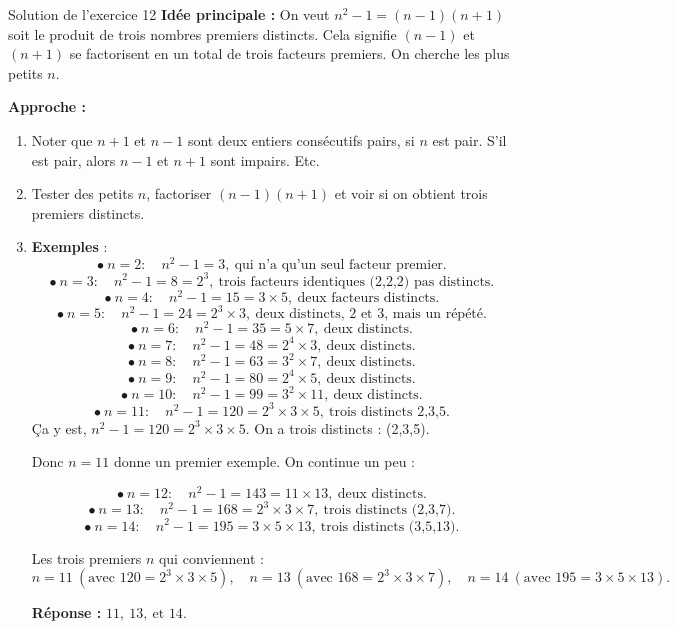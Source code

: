 \documentclass[a4paper,12pt]{article}
\begin{document}
\begin{solutionbox}{Solution de l'exercice 12}
\textbf{Idée principale :} On veut $n^2 -1=(n-1)(n+1)$ soit le produit de trois nombres premiers distincts.  
Cela signifie $(n-1)$ et $(n+1)$ se factorisent en un total de trois facteurs premiers.  
On cherche les plus petits $n$.

\textbf{Approche :}  
\begin{enumerate}
  \item Noter que $n+1$ et $n-1$ sont deux entiers consécutifs pairs, si $n$ est pair. S’il est pair, alors $n-1$ et $n+1$ sont impairs. Etc.  
  \item Tester des petits $n$, factoriser $(n-1)(n+1)$ et voir si on obtient trois premiers distincts.

\item \textbf{Exemples} :
\[
\bullet\ n=2:\quad n^2-1=3,\ \text{qui n’a qu’un seul facteur premier.}
\]
\[
\bullet\ n=3:\quad n^2-1=8=2^3,\ \text{trois facteurs identiques (2,2,2) pas distincts.}
\]
\[
\bullet\ n=4:\quad n^2-1=15=3\times5,\ \text{deux facteurs distincts.}
\]
\[
\bullet\ n=5:\quad n^2-1=24=2^3\times3,\ \text{deux distincts, 2 et 3, mais un répété.}
\]
\[
\bullet\ n=6:\quad n^2-1=35=5\times7,\ \text{deux distincts.}
\]
\[
\bullet\ n=7:\quad n^2-1=48=2^4\times3,\ \text{deux distincts.}
\]
\[
\bullet\ n=8:\quad n^2-1=63=3^2\times7,\ \text{deux distincts.}
\]
\[
\bullet\ n=9:\quad n^2-1=80=2^4\times5,\ \text{deux distincts.}
\]
\[
\bullet\ n=10:\quad n^2-1=99=3^2\times11,\ \text{deux distincts.}
\]
\[
\bullet\ n=11:\quad n^2-1=120=2^3\times3\times5,\ \text{trois distincts 2,3,5.}
\]
Ça y est, $n^2-1=120=2^3\times3\times5$. On a trois distincts : (2,3,5).

Donc $n=11$ donne un premier exemple. On continue un peu :

\[
\bullet\ n=12:\quad n^2-1=143=11\times13,\ \text{deux distincts.}
\]
\[
\bullet\ n=13:\quad n^2-1=168=2^3\times3\times7,\ \text{trois distincts (2,3,7).}
\]
\[
\bullet\ n=14:\quad n^2-1=195=3\times5\times13,\ \text{trois distincts (3,5,13).}
\]

Les trois premiers $n$ qui conviennent : 
\[
n=11\ (\text{avec }120=2^3\times3\times5),\quad
n=13\ (\text{avec }168=2^3\times3\times7),\quad
n=14\ (\text{avec }195=3\times5\times13).
\]

\textbf{Réponse :} $\boxed{11,\ 13,\ \text{et }14.}$

\end{enumerate}
\end{solutionbox}
\end{document}
